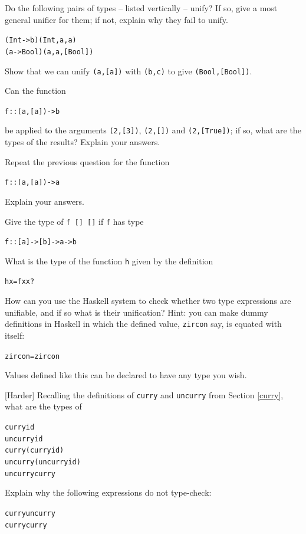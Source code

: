 \begin{exercises}

\item
Do the following pairs of types -- listed vertically -- unify? If so, give a most general
unifier for them; if not, explain why they fail to unify.
\begin{alltt}
(Int -> b)  \hspace*{2cm} (Int,a,a)
(a -> Bool) \hspace*{2cm} (a,a,[Bool])
\end{alltt}

\item
Show that we can unify \texttt{(a,[a])} with
\texttt{(b,c)} to give \texttt{(Bool,[Bool])}. 

\item
Can the function
\begin{alltt}
f :: (a,[a]) -> b
\end{alltt}
be applied to the arguments \texttt{(2,[3])}, \texttt{(2,[])} and \texttt{(2,[True])};
if so, what are the types of the results?
Explain your answers.

\item
Repeat the previous question for the function
\begin{alltt}
f :: (a,[a]) -> a
\end{alltt}
Explain your answers.

\item
Give the type of \texttt{f [] []} if \texttt{f} has type
\begin{alltt}
f :: [a] -> [b] -> a -> b
\end{alltt}
What is the type of the function \texttt{h} given by the definition
\begin{alltt}
h x = f x x ?
\end{alltt}

\item
How can you use the Haskell system to check whether two type expressions are
unifiable, and if so what is their unification? Hint: you can make dummy definitions
in Haskell in which the defined value, \texttt{zircon}
say, is equated with itself:
\begin{alltt}
zircon = zircon
\end{alltt}
Values defined like this can be declared to have any type you wish.

\item
{[Harder]} Recalling the definitions of \texttt{curry} and
\texttt{uncurry} from Section \ref{curry}, what are the types of
\begin{alltt}
curry id
uncurry id
curry (curry id)
uncurry (uncurry id)
uncurry curry
\end{alltt}
Explain why the following expressions do not type-check:
\begin{alltt}
curry uncurry
curry curry
\end{alltt} 


\end{exercises}
